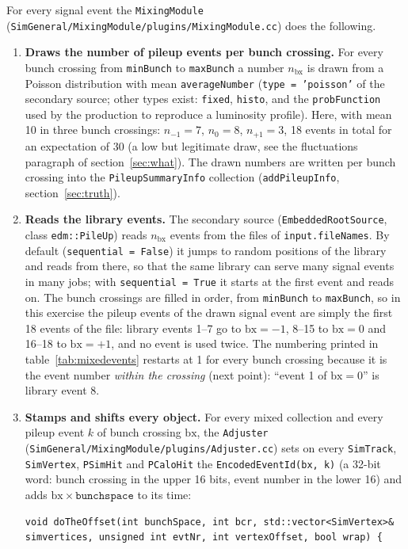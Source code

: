 \documentclass[11pt,a4paper]{article}
\newcommand{\code}[1]{\texttt{#1}}
\newcommand{\bx}{\ensuremath{\mathrm{bx}}}
\begin{document}
For every signal event the \code{MixingModule} (\code{SimGeneral/MixingModule/plugins/MixingModule.cc})
does the following.
\begin{enumerate}
\item \textbf{Draws the number of pileup events per bunch crossing.} For every bunch crossing from
  \code{minBunch} to \code{maxBunch} a number $n_{\bx}$ is drawn from a Poisson distribution with mean \code{averageNumber}
  (\code{type = 'poisson'} of the secondary source; other types exist: \code{fixed}, \code{histo}, and the
  \code{probFunction} used by the production to reproduce a luminosity profile). Here, with mean 10 in three
  bunch crossings: $n_{-1}=7$, $n_0=8$, $n_{+1}=3$, 18 events in total for an expectation of 30 (a low but
  legitimate draw, see the fluctuations paragraph of section~\ref{sec:what}).
  The drawn numbers are written per bunch crossing into the \code{PileupSummaryInfo} collection
  (\code{addPileupInfo}, section~\ref{sec:truth}).
\item \textbf{Reads the library events.} The secondary source (\code{EmbeddedRootSource}, class
  \code{edm::PileUp}) reads $n_{\bx}$ events from the files of \code{input.fileNames}. By default
  (\code{sequential = False}) it jumps to random positions of the library and reads from there, so that the
  same library can serve many signal events in many jobs; with \code{sequential = True} it starts at the first
  event and reads on. The bunch crossings are filled in order, from \code{minBunch} to \code{maxBunch}, so in
  this exercise the pileup events of the drawn signal event are simply the first 18 events of the file:
  library events 1--7 go to $\bx=-1$, 8--15 to $\bx=0$ and 16--18 to $\bx=+1$, and no event is used twice.
  The numbering printed in table~\ref{tab:mixedevents} restarts at 1 for every bunch crossing because it is
  the event number \emph{within the crossing} (next point): ``event 1 of $\bx=0$'' is library event 8.
\item \textbf{Stamps and shifts every object.} For every mixed collection and every pileup event $k$ of bunch
  crossing $\bx$, the \code{Adjuster} (\code{SimGeneral/MixingModule/plugins/Adjuster.cc}) sets on every
  \code{SimTrack}, \code{SimVertex}, \code{PSimHit} and \code{PCaloHit} the \code{EncodedEventId(bx, k)}
  (a 32-bit word: bunch crossing in the upper 16 bits, event number in the lower 16) and adds
  $\bx\times\code{bunchspace}$ to its time:
\begin{lstlisting}[style=cpp]
void doTheOffset(int bunchSpace, int bcr, std::vector<SimVertex>& simvertices, unsigned int evtNr, int vertexOffset, bool wrap) {

\end{lstlisting}
\end{enumerate}
\end{document}
